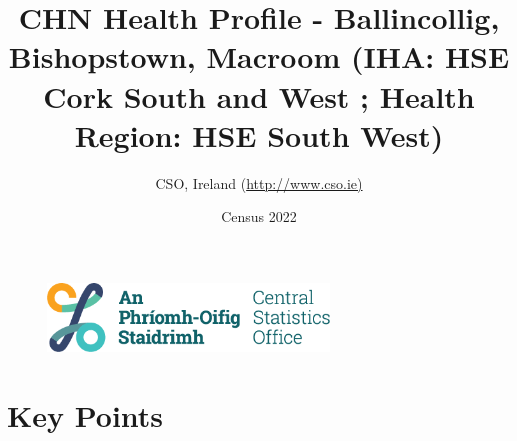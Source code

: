 \documentclass{article}
\title{CHN Health Profile - Ballincollig, Bishopstown, Macroom (IHA: HSE Cork South and West ;  Health Region: HSE South West) }
\date{Census 2022}
\author{CSO, Ireland  (\url{http://www.cso.ie)}}
\begin{document}


\begin{figure}
	\centering
\includegraphics[width =75mm]{../figures/CSO_Logo.png}
\end{figure}

				 
		   
						  
														  
																																													
												 
			 
\maketitle
					
													   
				 
						 
																																																																											   
				 
				  
  \pagebreak
    	    \tableofcontents

\pagebreak


\section{Key Points}
\end{document}
